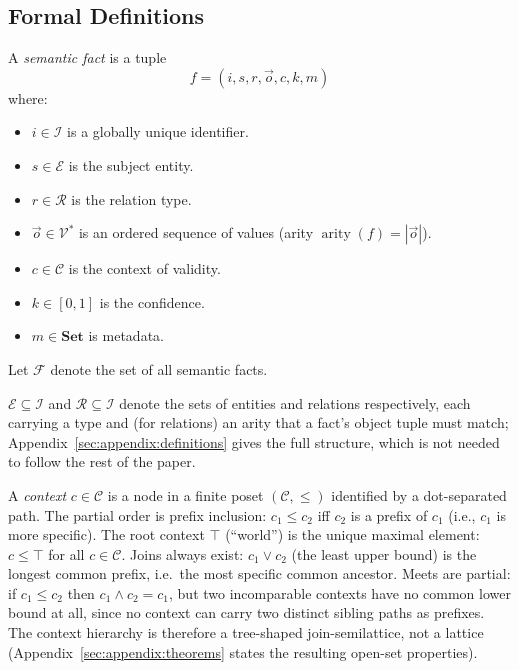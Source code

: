 \subsection{Formal Definitions}
\label{sec:formal_definitions}

\begin{definition}[SemanticFact]
\label{def:semanticfact}
A \emph{semantic fact} is a tuple
\[
f = (i, s, r, \vec{o}, c, k, m)
\]
where:
\begin{itemize}
    \item $i \in \mathcal{I}$ is a globally unique identifier.
    \item $s \in \mathcal{E}$ is the subject entity.
    \item $r \in \mathcal{R}$ is the relation type.
    \item $\vec{o} \in \mathcal{V}^*$ is an ordered sequence of values (arity $\operatorname{arity}(f) = |\vec{o}|$).
    \item $c \in \mathcal{C}$ is the context of validity.
    \item $k \in [0,1]$ is the confidence.
    \item $m \in \mathbf{Set}$ is metadata.
\end{itemize}
Let $\mathcal{F}$ denote the set of all semantic facts.
\end{definition}

$\mathcal{E} \subseteq \mathcal{I}$ and $\mathcal{R} \subseteq \mathcal{I}$
denote the sets of entities and relations respectively, each carrying a
type and (for relations) an arity that a fact's object tuple must match;
Appendix~\ref{sec:appendix:definitions} gives the full structure, which is
not needed to follow the rest of the paper.

\begin{definition}[Context]
\label{def:context}
A \emph{context} $c \in \mathcal{C}$ is a node in a finite poset $(\mathcal{C}, \leq)$
identified by a dot-separated path. The partial order is prefix inclusion:
$c_1 \leq c_2$ iff $c_2$ is a prefix of $c_1$ (i.e., $c_1$ is more specific).
The root context $\top$ (``world'') is the unique maximal element:
$c \leq \top$ for all $c \in \mathcal{C}$.
Joins always exist: $c_1 \vee c_2$ (the least upper bound) is the longest
common prefix, i.e.\ the most specific common ancestor. Meets are partial:
if $c_1 \leq c_2$ then $c_1 \wedge c_2 = c_1$, but two incomparable
contexts have no common lower bound at all, since no context can carry two
distinct sibling paths as prefixes. The context hierarchy is therefore a
tree-shaped join-semilattice, not a lattice
(Appendix~\ref{sec:appendix:theorems} states the resulting open-set
properties).
\end{definition}

